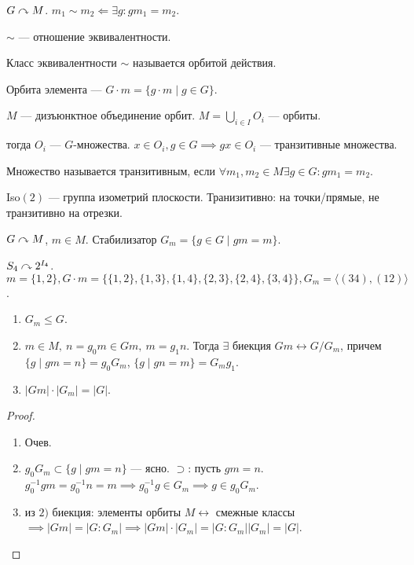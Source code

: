 \begin{definition}
    $G \curvearrowright M$.  $m_1 \sim m_2 \Leftarrow \exists g\!: gm_1 = m_2$.
\end{definition}
\begin{statement}
    $\sim$ --- отношение эквивалентности.
\end{statement}
\begin{definition}
    Класс эквивалентности $\sim$ называется орбитой действия.
\end{definition}
\begin{definition}
    Орбита элемента --- $G \cdot m = \{g \cdot m \mid g \in G\}$.
\end{definition}
 \begin{remark}
    $M$ --- дизъюнктное объединение орбит.
    $M = \bigcup\limits_{i \in I} O_i$ --- орбиты.

    тогда $O_i$ ---  $G$-множества.  $x \in O_i, g \in G \implies gx \in O_i$ --- транзитивные множества.
\end{remark}
\begin{definition}
    Множество называется транзитивным, если $\forall m_1, m_2 \in M \exists g \in G\!: gm_1 = m_2$.
\end{definition}
\begin{definition}
    Iso$(2)$ --- группа изометрий плоскости. Транизитивно: на точки/прямые, не транзитивно на отрезки.
\end{definition}
\begin{definition}
    $G \curvearrowright M$,  $m \in M$. Стабилизатор  $G_m = \{g \in G \mid gm = m\}$.
\end{definition}
\begin{example}
    $S_4 \curvearrowright 2^{I_4}$.  $m = \{1,2\}, G \cdot m = \{ \{1,2\}, \{1,3\}, \{1,4\}, \{2,3\},\{2,4\},\{3,4\}\}, G_m = \langle (34), (12) \rangle$.
\end{example}
\begin{theorem}
    \begin{enumerate}
        \item $G_m \le G$.
        \item $m \in M, ~ n = g_0m \in Gm, ~ m=g_1n$.  Тогда $\exists$ биекция $Gm \leftrightarrow G/G_m$, причем $\{g \mid gm = n\} = g_0 G_m$, $\{g \mid gn = m \} = G_mg_1$.
        \item $|Gm| \cdot |G_m| = |G|$.
    \end{enumerate}
\end{theorem}
\begin{proof}
    \begin{enumerate}
        \item Очев.
        \item $g_0G_m \subset \{g \mid gm = n\}$ --- ясно. $\supset$: пусть  $gm = n$.  $g_0^{-1}gm = g_0^{-1}n = m \implies g_0^{-1}g \in G_m \implies g \in g_0G_m$.
        \item из $2)$ биекция: элементы орбиты $M \leftrightarrow $ смежные классы  $\implies |Gm| = |G : G_m| \implies |Gm|\cdot |G_m| = |G:G_m||G_m| = |G|$.
    \end{enumerate}
\end{proof}
